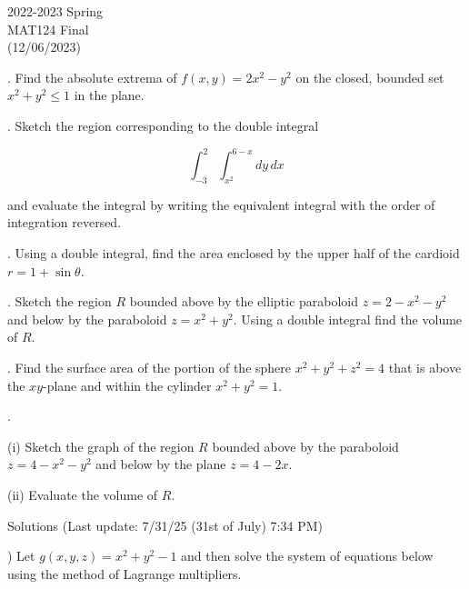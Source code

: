 \documentclass{article}
\begin{document}
\large

\begin{center}
2022-2023 Spring \\MAT124 Final\\(12/06/2023)
\end{center}

. Find the absolute extrema of $f(x,y) = 2x^2-y^2$ on the closed, bounded set $x^2+y^2\leq1$ in the plane.

\hfill

. Sketch the region corresponding to the double integral

\begin{equation*}\int_{-3}^2\int_{x^2}^{6-x}dy\,dx\end{equation*}

\hfill

\noindent and evaluate the integral by writing the equivalent integral with the order of integration reversed.

\hfill

. Using a double integral, find the area enclosed by the upper half of the cardioid $r=1+\sin\theta$.

\hfill

. Sketch the region $R$ bounded above by the elliptic paraboloid $z=2-x^2-y^2$ and below by the paraboloid $z=x^2+y^2$. Using a double integral find the volume of $R$.

\hfill

. Find the surface area of the portion of the sphere $x^2+y^2+z^2=4$ that is above the $xy$-plane and within the cylinder $x^2+y^2=1$.

\hfill

.

\hfill

\noindent (i) Sketch the graph of the region $R$ bounded above by the paraboloid $z=4-x^2-y^2$ and below by the plane $z=4-2x$.

\hfill

\noindent (ii) Evaluate the volume of $R$.

\newpage

\begin{center}
Solutions (Last update: 7/31/25 (31st of July) 7:34 PM)
\end{center}

) Let $g(x,y,z)=x^2+y^2-1$ and then solve the system of equations below using the method of Lagrange multipliers.
\end{document}
